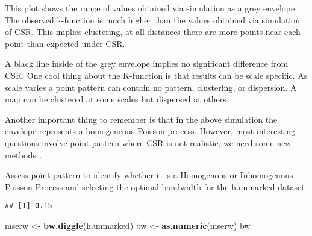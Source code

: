 \documentclass[]{article}
\newenvironment{Shaded}{\begin{snugshade}}{\end{snugshade}}
\newcommand{\DataTypeTok}[1]{\textcolor[rgb]{0.13,0.29,0.53}{#1}}
\newcommand{\DecValTok}[1]{\textcolor[rgb]{0.00,0.00,0.81}{#1}}
\newcommand{\FloatTok}[1]{\textcolor[rgb]{0.00,0.00,0.81}{#1}}
\newcommand{\KeywordTok}[1]{\textcolor[rgb]{0.13,0.29,0.53}{\textbf{#1}}}
\newcommand{\NormalTok}[1]{#1}
\newcommand{\OperatorTok}[1]{\textcolor[rgb]{0.81,0.36,0.00}{\textbf{#1}}}
\newcommand{\StringTok}[1]{\textcolor[rgb]{0.31,0.60,0.02}{#1}}
\begin{document}
This plot shows the range of values obtained via simulation as a grey
envelope. The observed k-function is much higher than the values
obtained via simulation of CSR. This implies clustering, at all
distances there are more points near each point than expected under CSR.

A black line inside of the grey envelope implies no significant
difference from CSR. One cool thing about the K-function is that results
can be scale specific. As scale varies a point pattern can contain no
pattern, clustering, or dispersion. A map can be clustered at some
scales but dispersed at others.

Another important thing to remember is that in the above simulation the
envelope represents a homogeneous Poisson process. However, most
interesting questions involve point pattern where CSR is not realistic,
we need some new methods\ldots{}

Assess point pattern to identify whether it is a Homogenous or
Inhomogenous Poisson Process and selecting the optimal bandwidth for the
h.unmarked dataset

\begin{Shaded}
\end{Shaded}

\begin{verbatim}
## [1] 0.15
\end{verbatim}

\begin{Shaded}
\begin{Highlighting}[]
\NormalTok{mserw <-}\StringTok{ }\KeywordTok{bw.diggle}\NormalTok{(h.unmarked)}
\NormalTok{bw <-}\StringTok{ }\KeywordTok{as.numeric}\NormalTok{(mserw)}
\NormalTok{bw}
\end{Highlighting}
\end{Shaded}
\end{document}
